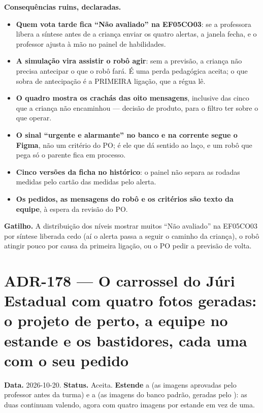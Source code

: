 \textbf{Consequências ruins, declaradas.}

\begin{itemize}
  \item \textbf{Quem vota tarde fica \enquote{Não avaliado} na EF05CO03}: se a
    professora libera a síntese antes de a criança enviar os quatro alertas,
    a janela fecha, e o professor ajusta à mão no painel de habilidades.
  \item \textbf{A simulação vira assistir o robô agir}: sem a previsão, a
    criança não precisa antecipar o que o robô fará. É uma perda pedagógica
    aceita; o que sobra de antecipação é a PRIMEIRA ligação, que a régua lê.
  \item \textbf{O quadro mostra os crachás das oito mensagens}, inclusive das
    cinco que a criança não encaminhou --- decisão de produto, para o filtro
    ter sobre o que operar.
  \item \textbf{O sinal \enquote{urgente e alarmante} no banco e na corrente
    segue o Figma}, não um critério do PO; é ele que dá sentido ao laço, e
    um robô que pega só o parente fica em processo.
  \item \textbf{Cinco versões da ficha no histórico}: o painel não separa as
    rodadas medidas pelo cartão das medidas pelo alerta.
  \item \textbf{Os pedidos, as mensagens do robô e os critérios são texto da
    equipe}, à espera da revisão do PO.
\end{itemize}

\textbf{Gatilho.} A distribuição dos níveis mostrar muitos \enquote{Não
avaliado} na EF05CO03 por síntese liberada cedo (aí o alerta passa a seguir
o caminho da criança), o robô atingir pouco por causa da primeira ligação,
ou o PO pedir a previsão de volta.

\section{ADR-178 --- O carrossel do Júri Estadual com quatro fotos geradas: o projeto de perto, a equipe no estande e os bastidores, cada uma com o seu pedido}
\label{adr:exp06ef1b-fotos-do-carrossel}

\textbf{Data.} 2026-10-20. \textbf{Status.} Aceita. \textbf{Estende} a
 (as imagens aprovadas pelo professor antes da turma) e a
 (as imagens do banco padrão, geradas pelo ): as duas
continuam valendo, agora com quatro imagens por estande em vez de uma.

